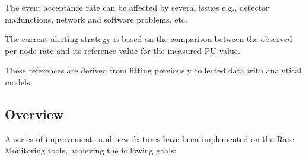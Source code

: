 The event acceptance rate can be affected by several issues e.g., detector malfunctions, network and software problems, etc.

The current alerting strategy is based on the comparison between the observed per-node rate and its reference value for the measured PU value.

These references are derived from fitting previously collected data with analytical models.

\subsection{Overview}

A series of improvements and new features have been implemented on the Rate Monitoring tools, achieving the following goals:

